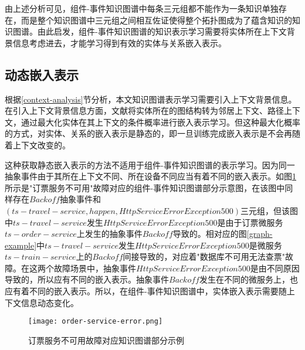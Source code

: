 由上述分析可见，组件-事件知识图谱中每条三元组都不能作为一条知识单独存在，而是整个知识图谱中三元组之间相互佐证使得整个拓扑图成为了蕴含知识的知识图谱。由此启发，组件-事件知识图谱的知识表示学习需要将实体所在上下文背景信息考虑进去，才能学习得到有效的实体与关系嵌入表示。
\subsection{动态嵌入表示}
根据\ref{context-analysis}节分析，本文知识图谱表示学习需要引入上下文背景信息。在引入上下文背景信息方面，文献\parencite{feng2016gake,shi2017knowledge}将实体所在的图结构转为邻居上下文、路径上下文，通过最大化实体在其上下文的条件概率进行嵌入表示学习。但这种最大化概率的方式，对实体、关系的嵌入表示是静态的，即一旦训练完成嵌入表示是不会再随着上下文改变的。

这种获取静态嵌入表示的方法不适用于组件-事件知识图谱的表示学习。因为同一抽象事件由于其所在上下文不同、所在设备不同应当有着不同的嵌入表示。如图\ref{order-service-error}所示是"订票服务不可用"故障对应的组件-事件知识图谱部分示意图，在该图中同样存在$Backoff$抽象事件和$\left(ts-travel-service, happen, HttpServiceError Exception 500\right)$三元组，但该图中$ts-travel-service$发生$HttpServiceError Exception 500$是由于订票微服务$ts-order-service$上发生的抽象事件$Backoff$导致的。相对应的图\ref{graph-example}中$ts-travel-service$发生$HttpServiceError Exception 500$是微服务$ts-train-service$上的$Backoff$间接导致的，对应着"数据库不可用无法查票"故障。在这两个故障场景中，抽象事件$HttpServiceError Exception 500$是由不同原因导致的，所以应有不同的嵌入表示。抽象事件$Backoff$发生在不同的微服务上，也应有着不同的嵌入表示。所以，在组件-事件知识图谱中，实体嵌入表示需要随上下文信息动态变化。
\begin{figure}[htbp]
    \centering
    \texttt{[image: order-service-error.png]}
    \caption{订票服务不可用故障对应知识图谱部分示例\label{order-service-error}}
\end{figure}

